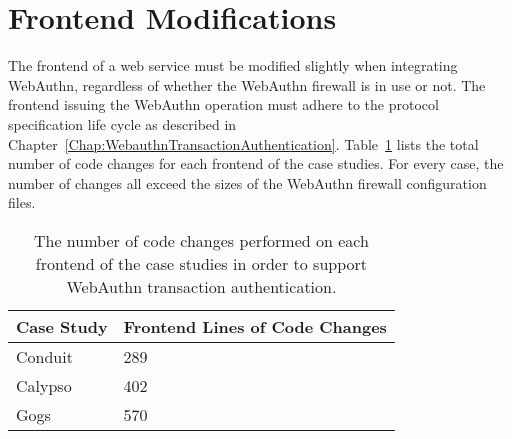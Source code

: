 







\section{Frontend Modifications}

The frontend of a web service must be modified slightly when integrating WebAuthn, regardless of whether the WebAuthn firewall is in use or not. The frontend issuing the WebAuthn operation must adhere to the protocol specification life cycle as described in Chapter~\ref{Chap:WebauthnTransactionAuthentication}. Table~\ref{Table:EvaluationsFrontendModifications} lists the total number of code changes for each frontend of the case studies. For every case, the number of changes all exceed the sizes of the WebAuthn firewall configuration files.

\begin{table}[h]
\centering

\begin{tabular}{ m{4.5cm} m{6cm}  } 
 \hline
 Case Study & Frontend Lines of Code Changes \\ 
 \hline \hline

 Conduit & 289 \\ \hline

 Calypso & 402 \\ \hline

 Gogs & 570 \\ \hline

\end{tabular}
\caption{The number of code changes performed on each frontend of the case studies in order to support WebAuthn transaction authentication.}
\label{Table:EvaluationsFrontendModifications}
\end{table}

